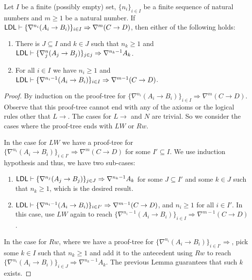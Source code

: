 \documentclass[a4paper, 12pt]{paper}
\begin{document}
\begin{thm}
  Let $I$ be a finite (possibly empty) set, $\{ n_i \}_{i \in I}$ be a finite sequence of natural numbers and $m \ge 1$ be a natural number. If $\mathsf{LDL} \vdash \{ \nabla^{n_i} (A_i \to B_i) \}_{i \in I} \Rightarrow \nabla^m (C \to D)$, then either of the following holds:
  \begin{enumerate}
    \item There is $J \subseteq I$ and $k \in J$ such that $n_k \ge 1$ and $\mathsf{LDL} \vdash \{ \nabla^n_j (A_j \to B_j) \}_{j \in j} \Rightarrow \nabla^{n_k - 1} A_k$.
    \item For all $i \in I$ we have $n_i \ge 1$ and $\mathsf{LDL} \vdash \{ \nabla^{n_i - 1} (A_i \to B_i) \}_{i \in I} \Rightarrow \nabla^{m - 1} (C \to D)$.
  \end{enumerate}
\end{thm}
\begin{proof}


  By induction on the proof-tree for $\{ \nabla^{n_i} (A_i \to B_i) \}_{i \in I} \Rightarrow \nabla^m (C \to D)$. Observe that this proof-tree cannot end with any of the axioms or the logical rules other that $L \to$. The cases for $L \to$ and $N$ are trivial. So we consider the cases where the proof-tree ends with $LW$ or $Rw$. 

  In the case for $LW$ we have a proof-tree for $\{ \nabla^{n_i} (A_i \to B_i) \}_{i \in I'} \Rightarrow \nabla^m (C \to D)$ for some $I' \subseteq I$. We use induction hypothesis and thus, we have two sub-cases:
  \begin{enumerate}
    \item $\mathsf{LDL} \vdash \{ \nabla^{n_j} (A_j \to B_j) \}_{j \in J} \Rightarrow \nabla^{n_k - 1} A_k$ for some $J \subseteq I'$ and some $k \in J$ such that $n_k \ge 1$, which is the desired result.
    \item $\mathsf{LDL} \vdash \{ \nabla^{n_i - 1} (A_i \to B_i) \}_{i \in I'} \Rightarrow \nabla^{m - 1} (C \to D)$, and $n_i \ge 1$ for all $i \in I'$. In this case, use $LW$ again to reach $\{ \nabla^{n_i - 1} (A_i \to B_i) \}_{i \in I} \Rightarrow \nabla^{m - 1} (C \to D)$.
  \end{enumerate}

  In the case for $Rw$, where we have a proof-tree for $\{ \nabla^{n_i} (A_i \to B_i) \}_{i \in I'} \Rightarrow$, pick some $k \in I$ such that $n_{k} \ge 1$ and add it to the antecedent using $Rw$ to reach $\{ \nabla^{n_i} (A_i \to B_i) \}_{i \in J} \Rightarrow \nabla^{n_k - 1} A_k$. The previous Lemma guarantees that such $k$ exists.
\end{proof}
\end{document}

